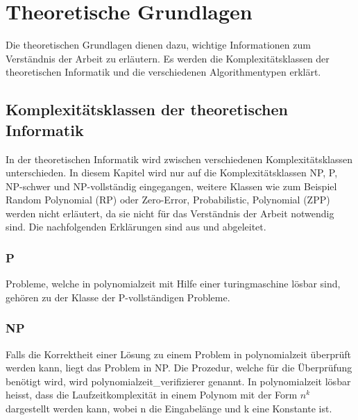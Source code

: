 %
%

\chapter{Theoretische Grundlagen}\label{chap.einleitung}
Die theoretischen Grundlagen dienen dazu, wichtige Informationen zum Verständnis der Arbeit zu erläutern. Es werden die Komplexitätsklassen der theoretischen Informatik und die verschiedenen 
Algorithmentypen erklärt.

\section{Komplexitätsklassen der theoretischen Informatik}\label{cat_theo_inf}
In der theoretischen Informatik wird zwischen verschiedenen Komplexitätsklassen unterschieden. In diesem Kapitel wird nur auf die Komplexitätsklassen NP, P, NP-schwer und 
NP-vollständig eingegangen, weitere Klassen wie zum Beispiel Random Polynomial (RP) oder Zero-Error, Probabilistic, Polynomial (ZPP) werden nicht erläutert, da sie nicht für das Verständnis der 
Arbeit notwendig sind. Die nachfolgenden Erklärungen sind aus \cite{hopcroft2011einfuehrung} und \cite{slides_p_np} abgeleitet.

\subsection{P}\label{p_complet}
Probleme, welche in \gls{polynomialzeit} mit Hilfe einer  \gls{turingmaschine} lösbar sind, gehören zu der Klasse der P-vollständigen Probleme.

\subsection{NP}\label{np}
Falls die Korrektheit einer Lösung zu einem Problem in \gls{polynomialzeit} überprüft werden kann, liegt das Problem in NP. Die Prozedur, welche für die Überprüfung benötigt wird, 
wird \gls{polynomialzeit_verifizierer} genannt.  In \gls{polynomialzeit} lösbar heisst, dass die Laufzeitkomplexität in einem Polynom mit der Form $n^k$ dargestellt werden kann, wobei n die 
Eingabelänge und k eine Konstante ist.


